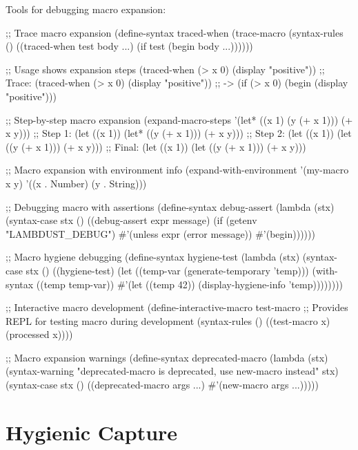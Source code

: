 
Tools for debugging macro expansion:

\begin{example}
\begin{lambdustcode}
;; Trace macro expansion
(define-syntax traced-when
  (trace-macro
    (syntax-rules ()
      ((traced-when test body ...)
       (if test (begin body ...))))))

;; Usage shows expansion steps
(traced-when (> x 0) (display "positive"))
;; Trace: (traced-when (> x 0) (display "positive"))
;;     -> (if (> x 0) (begin (display "positive")))

;; Step-by-step macro expansion
(expand-macro-steps '(let* ((x 1) (y (+ x 1))) (+ x y)))
;; Step 1: (let ((x 1)) (let* ((y (+ x 1))) (+ x y)))
;; Step 2: (let ((x 1)) (let ((y (+ x 1))) (+ x y)))
;; Final:  (let ((x 1)) (let ((y (+ x 1))) (+ x y)))

;; Macro expansion with environment info
(expand-with-environment '(my-macro x y) 
  '((x . Number) (y . String)))

;; Debugging macro with assertions
(define-syntax debug-assert
  (lambda (stx)
    (syntax-case stx ()
      ((debug-assert expr message)
       (if (getenv "LAMBDUST_DEBUG")
           #'(unless expr (error message))
           #'(begin))))))

;; Macro hygiene debugging  
(define-syntax hygiene-test
  (lambda (stx)
    (syntax-case stx ()
      ((hygiene-test)
       (let ((temp-var (generate-temporary 'temp)))
         (with-syntax ((temp temp-var))
           #'(let ((temp 42))
               (display-hygiene-info 'temp))))))))

;; Interactive macro development
(define-interactive-macro test-macro
  ;; Provides REPL for testing macro during development
  (syntax-rules ()
    ((test-macro x) (processed x))))

;; Macro expansion warnings
(define-syntax deprecated-macro
  (lambda (stx)
    (syntax-warning "deprecated-macro is deprecated, use new-macro instead" stx)
    (syntax-case stx ()
      ((deprecated-macro args ...)
       #'(new-macro args ...)))))
\end{lambdustcode}
\end{example}

\section{Hygienic Capture}
\label{sec:hygienic-capture}

